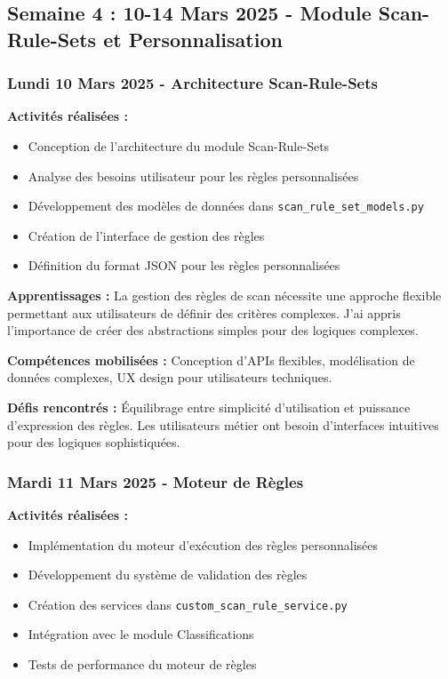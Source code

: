 \subsection{Semaine 4 : 10-14 Mars 2025 - Module Scan-Rule-Sets et Personnalisation}

\subsubsection{Lundi 10 Mars 2025 - Architecture Scan-Rule-Sets}

\textbf{Activités réalisées :}
\begin{itemize}
    \item Conception de l'architecture du module Scan-Rule-Sets
    \item Analyse des besoins utilisateur pour les règles personnalisées
    \item Développement des modèles de données dans \texttt{scan\_rule\_set\_models.py}
    \item Création de l'interface de gestion des règles
    \item Définition du format JSON pour les règles personnalisées
\end{itemize}

\textbf{Apprentissages :}
La gestion des règles de scan nécessite une approche flexible permettant aux utilisateurs de définir des critères complexes. J'ai appris l'importance de créer des abstractions simples pour des logiques complexes.

\textbf{Compétences mobilisées :}
Conception d'APIs flexibles, modélisation de données complexes, UX design pour utilisateurs techniques.

\textbf{Défis rencontrés :}
Équilibrage entre simplicité d'utilisation et puissance d'expression des règles. Les utilisateurs métier ont besoin d'interfaces intuitives pour des logiques sophistiquées.

\subsubsection{Mardi 11 Mars 2025 - Moteur de Règles}

\textbf{Activités réalisées :}
\begin{itemize}
    \item Implémentation du moteur d'exécution des règles personnalisées
    \item Développement du système de validation des règles
    \item Création des services dans \texttt{custom\_scan\_rule\_service.py}
    \item Intégration avec le module Classifications
    \item Tests de performance du moteur de règles
\end{itemize}

